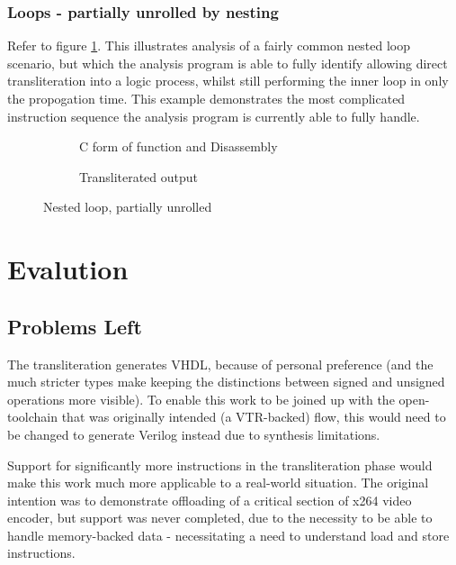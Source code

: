 \documentclass[a4paper]{article}
\begin{document}
\subsubsection{Loops - partially unrolled by nesting}
Refer to figure \ref{fig:loop-partial}.
This illustrates analysis of a fairly common nested loop scenario, but which the analysis program is able to fully identify allowing direct transliteration into a logic process, whilst still performing the inner loop in only the propogation time. This example demonstrates the most complicated instruction sequence the analysis program is currently able to fully handle.

\begin{figure}
  \begin{subfigure}[b]{0.5\textwidth}
    
    
    \caption{C form of function and Disassembly}
  \end{subfigure}
  \begin{subfigure}[b]{0.5\textwidth}
    
    \caption{Transliterated output}
  \end{subfigure}
  \caption{Nested loop, partially unrolled}
  \label{fig:loop-partial}
\end{figure}

\section{Evalution}
\subsection{Problems Left}
The transliteration generates VHDL, because of personal preference (and the much stricter types make keeping the distinctions between signed and unsigned operations more visible). To enable this work to be joined up with the open-toolchain that was originally intended (a VTR-backed) flow, this would need to be changed to generate Verilog instead due to synthesis limitations.

Support for significantly more instructions in the transliteration phase would make this work much more applicable to a real-world situation. The original intention was to demonstrate offloading of a critical section of x264 video encoder, but support was never completed, due to the necessity to be able to handle memory-backed data - necessitating a need to understand load and store instructions.
\end{document}
